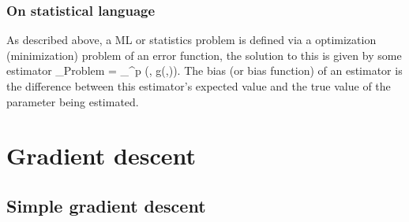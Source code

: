 \subsubsection{On statistical language}
As described above, a ML or statistics problem is defined via a optimization (minimization) problem of an error function, the solution to this is given by some estimator
\be 
\hat{\mw}_{Problem} = \arg \min_{\mw \in \mR^p} \mC(\mX, g(\mw,\my)).
\ee 
The bias (or bias function) of an estimator is the difference between this estimator's expected value and the true value of the parameter being estimated.







\section{Gradient descent}
\label{sec:gd}
\subsection{Simple gradient descent}

